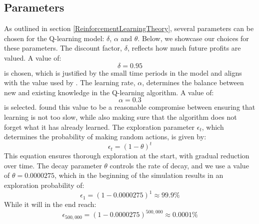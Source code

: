 \documentclass{article}
\begin{document}
\subsection{Parameters}
\label{Parameters}
As outlined in section \ref{ReinforcementLearningTheory}, several parameters can be chosen for the Q-learning model: $\delta$, $\alpha$ and $\theta$. Below, we showcase our choices for these parameters.
\newline
The discount factor, $\delta$, reflects how much future profits are valued. A value of:
$$\delta = 0.95$$
is chosen, which is justified by the small time periods in the model and aligns with the value used by \cite{Klein2021}.
\newline
The learning rate, $\alpha$, determines the balance between new and existing knowledge in the Q-learning algorithm. A value of:
$$\alpha = 0.3$$
is selected. \cite{Klein2021} found this value to be a reasonable compromise between ensuring that learning is not too slow, while also making sure that the algorithm does not forget what it has already learned.
\newline
The exploration parameter $\epsilon_t$, which determines the probability of making random actions, is given by:
\begin{equation}
\label{eq:epsilon-theta}
    \epsilon_t = (1-\theta)^t
\end{equation}
This equation ensures thorough exploration at the start, with gradual reduction over time. The decay parameter $\theta$ controls the rate of decay, and we use a  value of $\theta = 0.0000275$, which in the beginning of the simulation results in an exploration probability of:
\begin{equation}
    \epsilon_{1} = (1 - 0.0000275)^{1} \approx 99.9\%
\end{equation}
While it will in the end reach:
\begin{equation}
    \epsilon_{500,000} = (1 - 0.0000275)^{500,000} \approx 0.0001\%
\end{equation}
\end{document}
